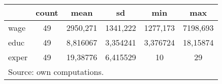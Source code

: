 {
\def\sym#1{\ifmmode^{#1}\else\(^{#1}\)\fi}
\begin{tabular}{l*{1}{ccccc}}
\hline\hline
                    &       count&        mean&          sd&         min&         max\\
\hline
wage                &          49&    2950,271&    1341,222&    1277,173&    7198,693\\
educ                &          49&    8,816067&    3,354241&    3,376724&    18,15874\\
exper               &          49&    19,38776&    6,415529&          10&          29\\
\hline\hline
\multicolumn{6}{l}{\footnotesize Source: own computations.}\\
\end{tabular}
}
